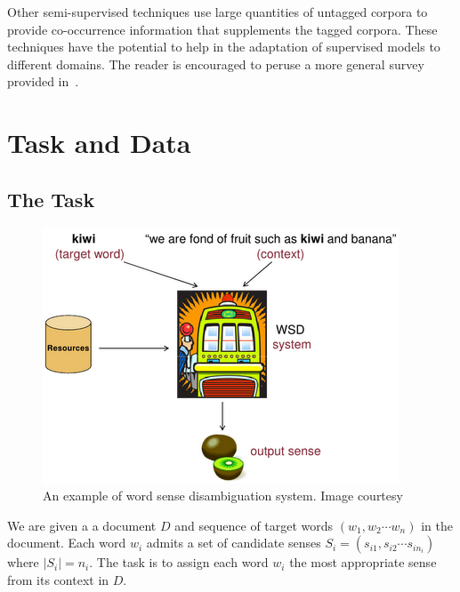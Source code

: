 \documentclass[11pt,letterpaper]{article}
\newcommand{\blue}[1]{\textcolor{RoyalBlue}{#1}}
\newcommand{\instructions}[1]{\blue{\textit{#1}}}
\begin{document}

Other semi-supervised techniques use large quantities of untagged corpora to provide co-occurrence information that supplements the tagged corpora. These techniques have the potential to help in the adaptation of supervised models to different domains. The reader is encouraged to peruse a more general  survey provided in~\cite{navigli2009word}. 

\section{Task and Data}
\label{sec:taskAndData}

\subsection{The Task}
\label{sec:task}
\begin{figure}[!htbp]
\centering
\includegraphics[scale=0.8]{wsd.png}
\caption{An example of word sense disambiguation system. Image courtesy ~\protect\cite{navilgiblog}}
\end{figure}
We are given a a document $D$ and sequence of target words $(w_1,w_2 \cdots w_n)$ in the document. Each word $w_i$ admits a set of candidate senses $S_i=(s_{i1},s_{i2} \cdots s_{in_i})$ where $|S_i|= n_i$. The task is to assign each word $w_i$ the most appropriate sense from its context in $D$. 
\end{document}
